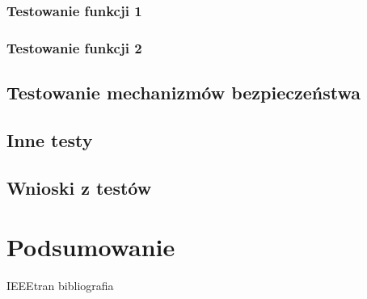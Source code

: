 \documentclass[a4paper, 12pt]{article}
\begin{document}
\subsubsection{Testowanie funkcji 1}
\subsubsection{Testowanie funkcji 2}
\subsection{Testowanie mechanizmów bezpieczeństwa}
\subsection{Inne testy}
\subsection{Wnioski z testów}
\section{Podsumowanie}

 {IEEEtran}
 {bibliografia} 
\nocite {*}
\end{document}
